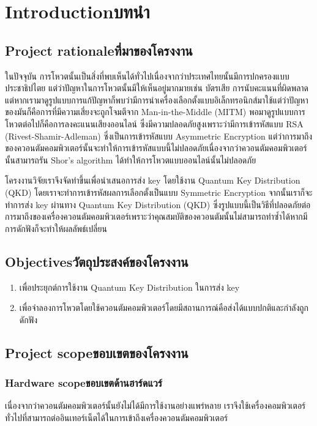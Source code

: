 \chapter{\ifenglish Introduction\else บทนำ\fi}

\section{\ifenglish Project rationale\else ที่มาของโครงงาน\fi}
ในปัจจุบัน การโหวตนั้นเป็นสิ่งที่พบเห็นได้ทั่วไปเนื่องจากว่าประเทศไทยนั้นมีการปกครองแบบประชาธิปไตย แต่ว่าปัญหาในการโหวตนั้นมีให้เห็นอยู่มากมายเช่น บัตรเสีย การนับคะแนนที่ผิดพลาด แต่หากเรามาดูรูปแบบการแก้ปัญหาก็พบว่ามีการนำเครื่องเลือกตั้งแบบอิเล็กทรอนิกส์มาใช้แต่ว่าปัญหาของมันก็คือการที่มีความเสี่ยงจะถูกโจมตีจาก Man-in-the-Middle (MITM) พอมาดูรูปแบบการโหวตต่อไปก็คือการลงคะแนนเสียงออนไลน์ ซึ่งมีความปลอดภัยสูงเพราะว่ามีการเข้ารหัสแบบ RSA (Rivest-Shamir-Adleman) ซึ่งเป็นการเข้ารหัสแบบ Asymmetric Encryption แต่ว่าการมาถึงของควอนตัมคอมพิวเตอร์นั้นจะทำให้การเข้ารหัสแบบนี้ไม่ปลอดภัยเนื่องจากว่าควอนตัมคอมพิวเตอร์นั้นสามารถรัน Shor's algorithm ได้ทำให้การโหวตแบบออนไลน์นั้นไม่ปลอดภัย 

โครงงานวิจัยเราจึงจัดทำขึ้นเพื่อนำเสนอการส่ง key โดยใช้งาน Quantum Key Distribution (QKD) โดยเราจะทำการเข้ารหัสผลการเลือกตั้งเป็นแบบ Symmetric Encryption จากนั้นเราก็จะทำการส่ง key ผ่านทาง Quantum Key Distribution (QKD) ซึ่งรูปแบบนี้เป็นวิธีที่ปลอดภัยต่อการมาถึงของเครื่องควอนตัมคอมพิวเตอร์เพราะว่าคุณสมบัติของควอนตัมนั้นไม่สามารถทำซ้ำได้หากมีการดักฟังก็จะทำให้ผลลัพธ์เปลี่ยน

\section{\ifenglish Objectives\else วัตถุประสงค์ของโครงงาน\fi}
\begin{enumerate}
    \item เพื่อประยุกต์การใช้งาน Quantum Key Distribution ในการส่ง key
    \item เพื่อจำลองการโหวตโดยใช้ควอนตัมคอมพิวเตอร์โดยมีสถานการณ์คือส่งได้แบบปกติและกำลังถูกดักฟัง
\end{enumerate}

\section{\ifenglish Project scope\else ขอบเขตของโครงงาน\fi}

\subsection{\ifenglish Hardware scope\else ขอบเขตด้านฮาร์ดแวร์\fi}
เนื่องจากว่าควอนตัมคอมพิวเตอร์นั้นยังไม่ได้มีการใช้งานอย่างแพร่หลาย เราจึงใช้เครื่องคอมพิวเตอร์ทั่วไปที่สามารถต่ออินเทอร์เน็ตได้ในการเข้าถึงเครื่องควอนตัมคอมพิวเตอร์

